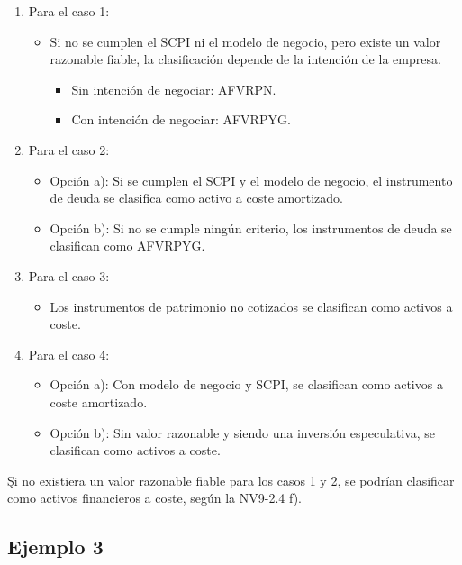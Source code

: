 \begin{enumerate}
    \item Para el caso 1:
    \begin{itemize}
        \item Si no se cumplen el SCPI ni el modelo de negocio, pero existe un valor razonable fiable, la clasificación depende de la intención de la empresa.
        \begin{itemize}
            \item Sin intención de negociar: AFVRPN.
            \item Con intención de negociar: AFVRPYG.
        \end{itemize}
    \end{itemize}

    \item Para el caso 2:
    \begin{itemize}
        \item Opción a): Si se cumplen el SCPI y el modelo de negocio, el instrumento de deuda se clasifica como activo a coste amortizado.
        \item Opción b): Si no se cumple ningún criterio, los instrumentos de deuda se clasifican como AFVRPYG.
    \end{itemize}

    \item Para el caso 3: 
    \begin{itemize}
        \item Los instrumentos de patrimonio no cotizados se clasifican como activos a coste.
    \end{itemize}

    \item Para el caso 4:
    \begin{itemize}
        \item Opción a): Con modelo de negocio y SCPI, se clasifican como activos a coste amortizado.
        \item Opción b): Sin valor razonable y siendo una inversión especulativa, se clasifican como activos a coste.
    \end{itemize}
\end{enumerate}

\c{Si no existiera un valor razonable fiable para los casos 1 y 2, se podrían clasificar como activos financieros a coste, según la NV9-2.4 f).}

\subsection*{Ejemplo 3}


